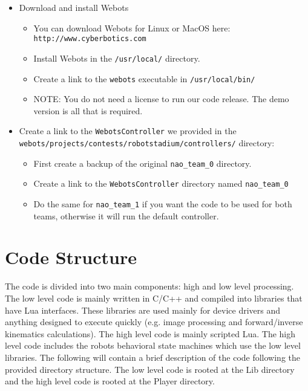 \documentclass{article}
\begin{document}
    \begin{itemize}
      \item Download and install Webots
      \begin{itemize}
        \item You can download Webots for Linux or MacOS here: \\
          \texttt{http://www.cyberbotics.com}
        \item Install Webots in the \texttt{/usr/local/} directory. 
        \item Create a link to the \texttt{webots} executable in \texttt{/usr/local/bin/}
        \item NOTE: You do not need a license to run our code release. The demo version is all that is required.
      \end{itemize}
      \item Create a link to the \texttt{WebotsController} we provided in the \\
        \texttt{webots/projects/contests/robotstadium/controllers/} directory:
      \begin{itemize}
        \item First create a backup of the original \texttt{nao\_team\_0} directory.
        \item Create a link to the \texttt{WebotsController} directory named \texttt{nao\_team\_0}
        \item Do the same for \texttt{nao\_team\_1} if you want the code to be used for both teams, otherwise it will run the default controller.
      \end{itemize}
    \end{itemize}


\section{Code Structure}
  
  The code is divided into two main components: high and low level processing. The low level code is mainly written in C/C++ and compiled into libraries that have Lua interfaces. These libraries are used mainly for device drivers and anything designed to execute quickly (e.g. image processing and forward/inverse kinematics calculations). The high level code is mainly scripted Lua. The high level code includes the robots behavioral state machines which use the low level libraries.
  The following will contain a brief description of the code following the provided directory structure. The low level code is rooted at the Lib directory and the high level code is rooted at the Player directory.
  
\end{document}
